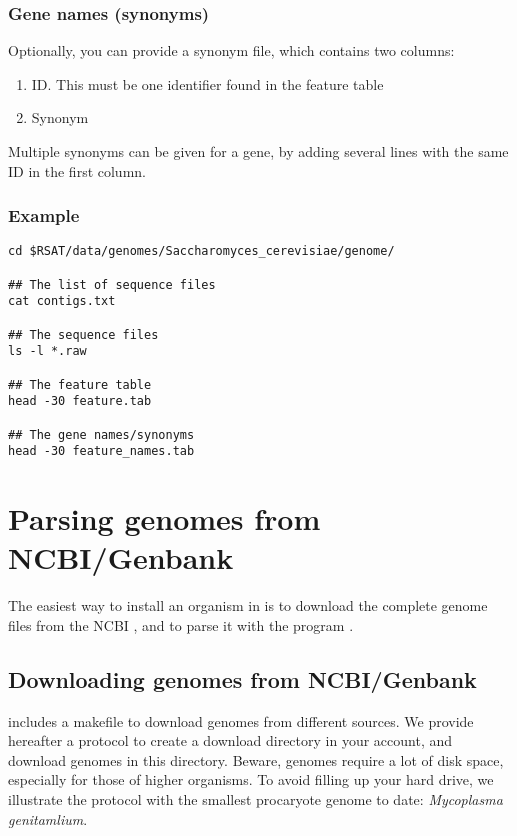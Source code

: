 \subsubsection{Gene names (synonyms)}

Optionally, you can provide a synonym file, which contains two
columns:

\begin{enumerate}
\item ID. This must be one identifier found in the feature table
\item Synonym
\end{enumerate}

Multiple synonyms can be given for a gene, by adding several lines with
the same ID in the first column.

\subsubsection{Example}

\begin{verbatim}
cd $RSAT/data/genomes/Saccharomyces_cerevisiae/genome/

## The list of sequence files
cat contigs.txt

## The sequence files
ls -l *.raw

## The feature table
head -30 feature.tab

## The gene names/synonyms
head -30 feature_names.tab

\end{verbatim}


\section{Parsing genomes from NCBI/Genbank}

The easiest way to install an organism in \RSAT is to download the
complete genome files from the NCBI
, and to parse it with the
program .

\subsection{Downloading genomes from NCBI/Genbank}

\RSAT includes a makefile to download genomes from different sources.
We provide hereafter a protocol to create a download directory in your
account, and download genomes in this directory. Beware, genomes
require a lot of disk space, especially for those of higher
organisms. To avoid filling up your hard drive, we illustrate the protocol
with the smallest procaryote genome to date: \textit{Mycoplasma
  genitamlium}.


